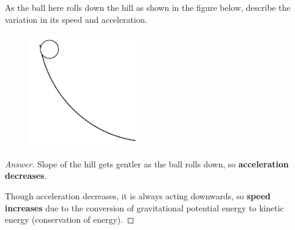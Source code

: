 \begin{prbm}
As the ball here rolls down the hill as shown in the figure below, describe the variation in its speed and acceleration.
\begin{figure}[H]
    \centering
    \includegraphics[width=5cm]{images/ball_roll.png}
\end{figure}
\end{prbm}

\begin{proof}[Answer]
Slope of the hill gets gentler as the ball rolls down, so \textbf{acceleration decreases}. 

Though acceleration decreases, it is always acting downwards, so \textbf{speed increases} due to the conversion of gravitational potential energy to kinetic energy (conservation of energy).
\end{proof}

\pagebreak